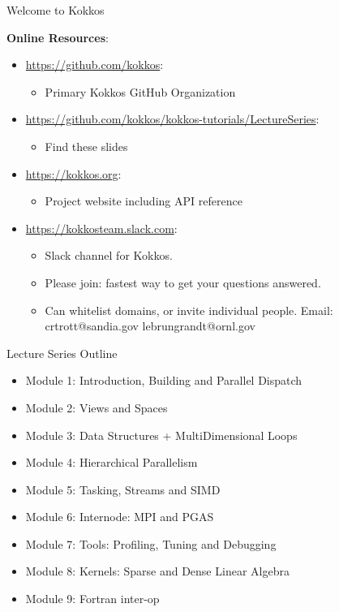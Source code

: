 \begin{frame}{Welcome to Kokkos}

\textbf{Online Resources}:

\begin{itemize}
	\item \url{https://github.com/kokkos}: 
		\begin{itemize}
			\item Primary Kokkos GitHub Organization
		\end{itemize}
	\item \url{https://github.com/kokkos/kokkos-tutorials/LectureSeries}: 
		\begin{itemize}
			\item{Find these slides}
		\end{itemize}
	\item \url{https://kokkos.org}: 
		\begin{itemize}
			\item Project website including API reference
		\end{itemize}
	\item \url{https://kokkosteam.slack.com}: 
		\begin{itemize}
			\item Slack channel for Kokkos.
			\item Please join: fastest way to get your questions answered.
			\item Can whitelist domains, or invite individual people. Email: crtrott@sandia.gov lebrungrandt@ornl.gov
		\end{itemize}
\end{itemize}

\end{frame}



\iffull
\begin{frame}{Lecture Series Outline}

\begin{itemize}
	\item Module 1: Introduction, Building and Parallel Dispatch
	\item Module 2: Views and Spaces
	\item Module 3: Data Structures + MultiDimensional Loops
	\item Module 4: Hierarchical Parallelism
	\item Module 5: Tasking, Streams and SIMD
	\item Module 6: Internode: MPI and PGAS
	\item Module 7: Tools: Profiling, Tuning and Debugging
	\item Module 8: Kernels: Sparse and Dense Linear Algebra
    \item Module 9: Fortran inter-op
\end{itemize}
\end{frame}
\fi

